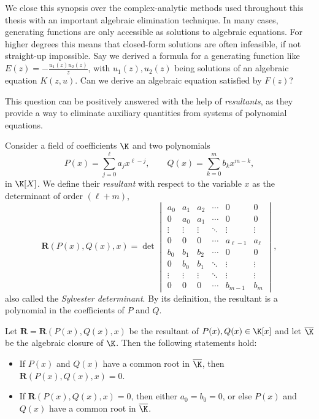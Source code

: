 We close this synopsis over the complex-analytic methods used throughout this thesis with an important algebraic elimination technique.
In many cases, generating functions are only accessible as solutions to algebraic equations. For higher degrees this means that closed-form solutions are often infeasible, if not straight-up impossible.
Say we derived a formula for a generating function like $E(z) = -\frac{u_1(z) u_2(z)}{z}$, with $u_1(z), u_2(z)$ being solutions of an algebraic equation $K(z,u)$. Can we derive an algebraic equation satisfied by $F(z)$?

This question can be positively answered with the help of \textit{resultants}, as they provide a way to eliminate auxiliary quantities from systems of polynomial equations.

\begin{definition}\label{def:resultant}
  Consider a field of coefficients $\K$ and two polynomials 
  $$
    P(x) = \sum\limits_{j=0}^{\ell} a_{j}x^{\ell-j}, \qquad Q(x) = \sum\limits_{k=0}^m b_{k}x^{m-k},
  $$
  in $\K[X]$. We define their \textit{resultant} with respect to the variable $x$ as the determinant of order $(\ell + m)$, 
  $$
    \mathbf{R}(P(x),Q(x),x) = \det \begin{vmatrix} a_{0} & a_{1} & a_{2} & \cdots & 0 & 0 \\
    0 & a_{0}& a_{1} & \cdots & 0 & 0 \\
    \vdots & \vdots & \vdots & \ddots & \vdots & \vdots \\
    0 & 0 & 0 & \cdots & a_{\ell-1} & a_{\ell}  \\ 
    b_{0} & b_{1} & b_{2} & \cdots & 0 & 0 \\
    0 & b_{0} & b_{1} & \ddots & \vdots & \vdots \\ 
    \vdots & \vdots & \vdots & \ddots & \vdots & \vdots \\
    0 & 0 & 0 & \cdots & b_{m-1} & b_{m} 
    \end{vmatrix},
  $$
  also called the \textit{Sylvester determinant}. By its definition, the resultant is a polynomial in the coefficients of $P$ and $Q$.
\end{definition}

\begin{proposition}
  Let $\mathbf{R} = \mathbf{R}(P(x),Q(x),x)$ be the resultant of $P(x), Q(x) \in \K[x]$ and let $\overline{\K}$ be the algebraic closure of $\K$. Then the following statements hold:
  \begin{itemize}
    \item If $P(x)$ and $Q(x)$ have a common root in $\overline{\K}$, then $\mathbf{R}(P(x),Q(x),x) = 0$.
    \item If $\mathbf{R}(P(x),Q(x),x) = 0$, then either $a_{0} = b_{0} = 0$, or else $P(x)$ and $Q(x)$ have a common root in $\overline{\K}$.
  \end{itemize}
\end{proposition}


